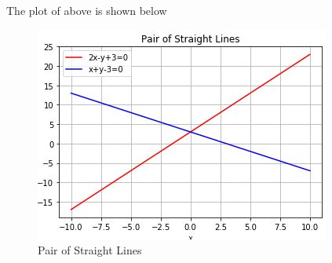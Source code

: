 The plot of above is shown below 
\begin{figure}[!htb]
	
	\centering
	
	\includegraphics[width=\columnwidth]{./solutions/13/13/Latex/assignment4fig.jpg}
	
	\caption{Pair of Straight Lines}
	
	\label{eq:solutions/13/13/fig:1}
	
\end{figure}

